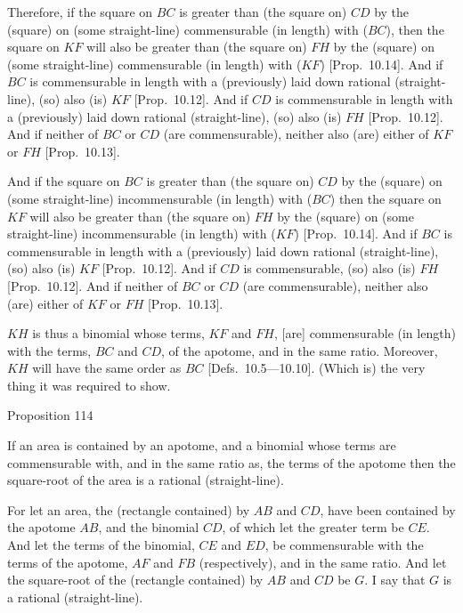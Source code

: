 Therefore,  if the square on $BC$ is greater than (the square on) $CD$
by the (square) on (some straight-line) commensurable (in length) with ($BC$), 
then the square on $KF$ will also be greater than (the square on) $FH$
by the (square) on (some straight-line) commensurable (in length) with ($KF$) [Prop.~10.14]. And if $BC$ is commensurable
in length with a (previously) laid down rational (straight-line), (so) also (is) $KF$
[Prop.~10.12].
And if $CD$ is commensurable in length with a (previously) laid
down rational (straight-line), (so) also  (is) $FH$ [Prop.~10.12]. And if neither of $BC$ or $CD$
(are commensurable), neither also (are) either of $KF$ or $FH$ [Prop.~10.13].

And if the square on $BC$ is greater than (the square on) $CD$
by the (square) on (some straight-line) incommensurable (in length) with ($BC$) then
the square on $KF$ will also be greater than (the square on) $FH$
by the (square) on (some straight-line) incommensurable (in length) with ($KF$) [Prop.~10.14]. And if $BC$ is commensurable
in length with a (previously) laid down rational (straight-line), (so) also (is) $KF$
[Prop.~10.12].
And if $CD$ is commensurable, (so) also (is) $FH$ [Prop.~10.12]. And if neither of $BC$ or $CD$
(are commensurable), neither also (are) either of $KF$ or $FH$ [Prop.~10.13].

$KH$ is thus a binomial whose terms, $KF$ and $FH$, [are] commensurable
(in length) with the terms, $BC$ and $CD$,  of the apotome, and in the same ratio. 
Moreover, $KH$ will have the same order as $BC$ [Defs.~10.5---10.10]. 
  (Which is) the very thing it was required to show.


\begin{center}
{\large Proposition 114}
\end{center}

If an area is contained by an apotome, and
a binomial whose terms are commensurable with, and in the same ratio as, the 
terms of the apotome then the square-root of the area is a rational (straight-line).

\epsfysize=1.8in
\centerline{}

For let an area, the  (rectangle contained) by $AB$ and $CD$, have
been contained by the
apotome $AB$, and the binomial $CD$, of which let the greater term be $CE$. And let the terms of the binomial, $CE$ and $ED$, be commensurable with the terms of the apotome, $AF$ and $FB$ (respectively), and in the same ratio. And
let the square-root of the (rectangle contained) by $AB$ and $CD$ be $G$.
I say that $G$ is a rational (straight-line).

